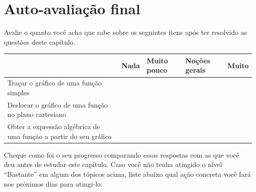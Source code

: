 \documentclass[main.tex]{subfiles}
\begin{document}
\section{Auto-avaliação final}
Avalie o quanto você acha que sabe sobre os seguintes itens após ter resolvido as questões deste capítulo.

\begin{center}
 \begin{tabular}{|p{25mm}||p{10mm}|p{10mm}|p{10mm}|p{10mm}|} 
 \hline
   & Nada & Muito pouco & Noções gerais & Muito\\
 \hline
 Traçar o gráfico de uma função simples &  &  &  &  \\ 
 \hline
 Deslocar o gráfico de uma função no plano cartesiano &  &  &  &  \\
 \hline
 Obter a expressão algébrica de uma função a partir do seu gráfico &  &  &  &  \\
 \hline
\end{tabular}
\end{center}

Cheque como foi o seu progresso comparando essas respostas com as que você deu antes de estudar este capítulo. Caso você não tenha atingido o nível ``Bastante''  em algum dos tópicos acima, liste abaixo qual ação concreta você fará nos próximos dias para atingi-lo:

\paraAmbos
\end{document}
